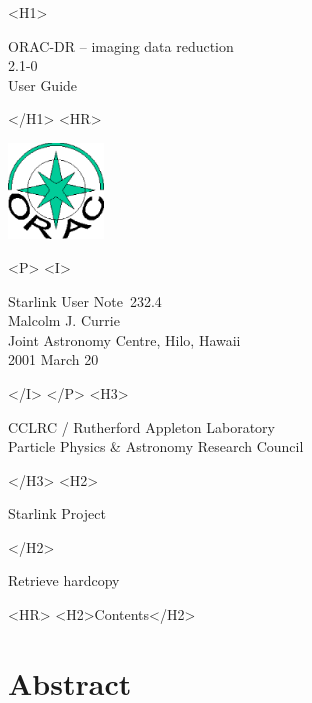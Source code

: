\documentclass[twoside,11pt]{article}
\newcommand{\stardoccategory}  {Starlink User Note}
\newcommand{\stardocsource}    {sun\stardocnumber}
\newcommand{\stardocnumber}    {232.4}
\newcommand{\stardocauthors}   {Malcolm J. Currie\\
                               Joint Astronomy Centre, Hilo, Hawaii}
\newcommand{\stardocdate}      {2001 March 20}
\newcommand{\stardoctitle}     {ORAC-DR -- imaging data reduction}
\newcommand{\stardocversion}   {2.1-0}
\newcommand{\stardocmanual}    {User Guide}
\newcommand{\htmladdnormallink}[2]{#1}
\newcommand{\htmladdimg}[1]{}
\newcommand{\htmlref}[2]{#1}
\newcommand{\htmladdtonavigation}[1]{}
\newcommand{\xlabel}[1]{}
\renewcommand{\_}{\texttt{\symbol{95}}}
\begin{document}
\begin{htmlonly}
   \xlabel{}
   \begin{rawhtml} <H1> \end{rawhtml}
      \stardoctitle\\
      \stardocversion\\
      \stardocmanual
   \begin{rawhtml} </H1> <HR> \end{rawhtml}

\includegraphics[width=1.0in]{sun232_logo.eps}

   \begin{rawhtml} <P> <I> \end{rawhtml}
   \stardoccategory\ \stardocnumber \\
   \stardocauthors \\
   \stardocdate
   \begin{rawhtml} </I> </P> <H3> \end{rawhtml}
      \htmladdnormallink{CCLRC / Rutherford Appleton Laboratory}
                        {http://www.cclrc.ac.uk} \\
      \htmladdnormallink{Particle Physics \& Astronomy Research Council}
                        {http://www.pparc.ac.uk} \\
   \begin{rawhtml} </H3> <H2> \end{rawhtml}
      \htmladdnormallink{Starlink Project}{http://www.starlink.rl.ac.uk/}
   \begin{rawhtml} </H2> \end{rawhtml}
   \htmladdnormallink{\htmladdimg{source.gif} Retrieve hardcopy}
      {http://www.starlink.rl.ac.uk/cgi-bin/hcserver?\stardocsource}\\

  \label{stardoccontents}
  \begin{rawhtml} 
    <HR>
    <H2>Contents</H2>
  \end{rawhtml}
  \htmladdtonavigation{\htmlref{\htmladdimg{contents_motif.gif}}
        {stardoccontents}}

  \section{\xlabel{abstract}Abstract}
\end{htmlonly}
\end{document}
